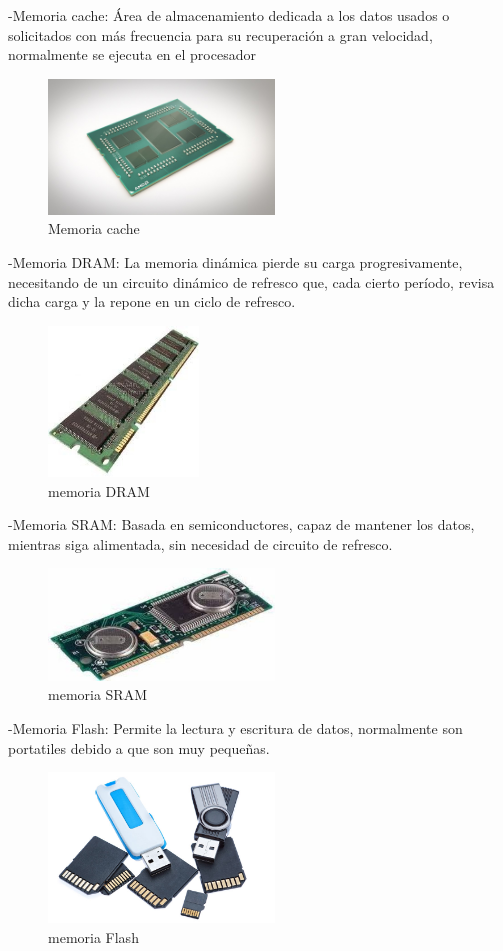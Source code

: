 \documentclass{article}
\begin{document}
-Memoria cache: Área de almacenamiento dedicada a los datos usados o solicitados con más frecuencia para su recuperación a gran velocidad, normalmente se ejecuta en el procesador \newline

\begin{figure}[h]
\includegraphics[width=6cm]{Cache.jpg}
\centering
\caption{Memoria cache}
\end{figure}

-Memoria DRAM: La memoria dinámica pierde su carga progresivamente, necesitando de un circuito dinámico de refresco que, cada cierto período, revisa dicha carga y la repone en un ciclo de refresco. \newline
\begin{figure}[h]
\includegraphics[width=4cm]{Dinamica.jpeg}
\centering
\caption{memoria DRAM}
\end{figure}

-Memoria SRAM: Basada en semiconductores, capaz de mantener los datos, mientras siga alimentada, sin necesidad de circuito de refresco. \newline
\begin{figure}[h]
\includegraphics[width=6cm]{Estatica.jpg}
\centering
\caption{memoria SRAM}
\end{figure}

-Memoria Flash: Permite la lectura y escritura de datos, normalmente son portatiles debido a que son muy pequeñas. \newline
\begin{figure}[h]
\includegraphics[width=6cm]{Flash.jpg}
\centering
\caption{memoria Flash}
\end{figure}
\end{document}
